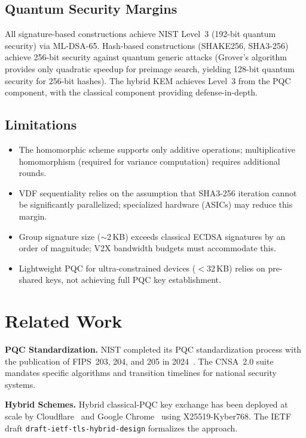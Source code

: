 \documentclass[conference,10pt]{IEEEtran}
\newcommand{\mldsa}{\textsf{ML-DSA}}
\newcommand{\shake}{\textsf{SHAKE256}}
\newcommand{\shaiii}{\textsf{SHA3-256}}
\begin{document}
\subsection{Quantum Security Margins}

All signature-based constructions achieve NIST Level~3 (192-bit quantum security) via \mldsa{}-65. Hash-based constructions (\shake{}, \shaiii{}) achieve 256-bit security against quantum generic attacks (Grover's algorithm provides only quadratic speedup for preimage search, yielding 128-bit quantum security for 256-bit hashes). The hybrid KEM achieves Level~3 from the PQC component, with the classical component providing defense-in-depth.

\subsection{Limitations}

\begin{itemize}
    \item The homomorphic scheme supports only additive operations; multiplicative homomorphism (required for variance computation) requires additional rounds.
    \item VDF sequentiality relies on the assumption that \shaiii{} iteration cannot be significantly parallelized; specialized hardware (ASICs) may reduce this margin.
    \item Group signature size ($\sim$2\,KB) exceeds classical ECDSA signatures by an order of magnitude; V2X bandwidth budgets must accommodate this.
    \item Lightweight PQC for ultra-constrained devices ($<$32\,KB) relies on pre-shared keys, not achieving full PQC key establishment.
\end{itemize}

\section{Related Work}
\label{sec:related}

\textbf{PQC Standardization.} NIST completed its PQC standardization process with the publication of FIPS~203, 204, and 205 in 2024~\cite{fips203, fips204, fips205}. The CNSA~2.0 suite~\cite{cnsa2} mandates specific algorithms and transition timelines for national security systems.

\textbf{Hybrid Schemes.} Hybrid classical-PQC key exchange has been deployed at scale by Cloudflare~\cite{cloudflare_pq} and Google Chrome~\cite{chrome_pq} using X25519-Kyber768. The IETF draft \texttt{draft-ietf-tls-hybrid-design} formalizes the approach.
\end{document}
